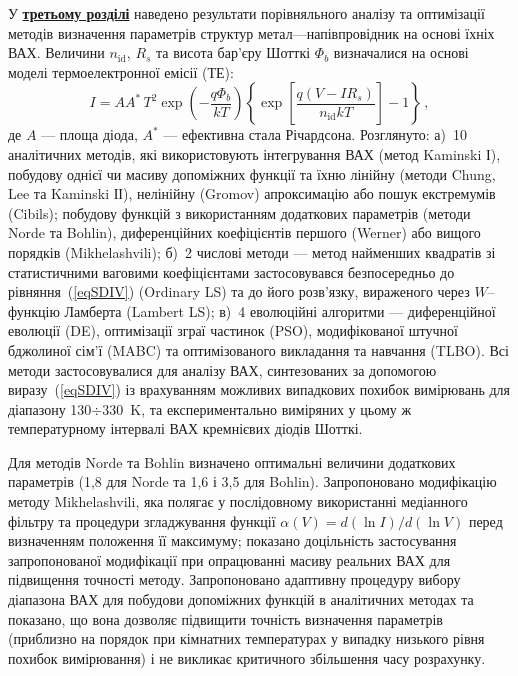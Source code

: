 У  \underline{\textbf{третьому розділі}} наведено результати порівняльного аналізу та оптимізації методів
визначення параметрів структур
метал---напівпровідник на основі їхніх ВАХ.
Величини $n_\mathrm{id}$, $R_s$ та висота бар'єру Шотткі $\Phi_b$ визначалися на основі
моделі термоелектронної емісії (ТЕ):
\begin{equation}\label{eqSDIV}
I=AA^*\,T^2\exp\left(-\frac{q\Phi_b}{kT}\right)\left\{\exp\left[\frac{q(V-IR_s)}{n_\mathrm{id}kT}\right]-1\right\}\,,
\end{equation}
де
$A$ --- площа діода,
$A^*$ --- ефективна стала Річардсона.
Розглянуто: 
а)~10 аналітичних методів, які використовують інтегрування ВАХ (метод Kaminski І),
побудову однієї чи масиву допоміжних функції та їхню лінійну (методи Chung, Lee та Kaminski ІІ),
нелінійну (Gromov) апроксимацію або пошук екстремумів (Cibils);
побудову функцій з використанням додаткових параметрів (методи Norde та Bohlin),
диференційних коефіцієнтів першого (Werner) або вищого порядків (Mikhelashvili);
б)~2 числові методи --- метод найменших квадратів зі статистичними ваговими коефіцієнтами
застосовувався безпосередньо до рівняння~(\ref{eqSDIV}) (Ordinary LS) та до
його розв'язку, вираженого через $W$--функцію Ламберта (Lambert LS);
в)~4 еволюційні алгоритми --- диференційної еволюції (DE),
оптимізації зграї частинок (PSO),
модифікованої штучної бджолиної сім'ї (MABC) та
оптимізованого викладання та навчання (TLBO).
Всі методи застосовувалися для аналізу
ВАХ,  синтезованих за допомогою виразу~(\ref{eqSDIV}) із врахуванням можливих випадкових похибок вимірювань
для діапазону 130$\div$330~K,
та експериментально виміряних у цьому ж температурному інтервалі ВАХ кремнієвих діодів Шотткі.

Для методів Norde та Bohlin визначено  оптимальні величини додаткових параметрів (1,8 для Norde та 1,6 і 3,5 для Bohlin).
Запропоновано модифікацію методу Mikhelashvili, яка
полягає у послідовному використанні медіанного фільтру та процедури згладжування функції $\alpha(V)=d(\ln I)/d(\ln V)$
перед визначенням положення її максимуму;
показано доцільність застосування запропонованої модифікації при опрацюванні масиву реальних ВАХ для
підвищення точності методу.
Запропоновано адаптивну процедуру вибору діапазона ВАХ для побудови допоміжних функцій в
аналітичних методах та показано, що вона дозволяє підвищити точність визначення параметрів
(приблизно на порядок при кімнатних температурах у випадку низького рівня похибок вимірювання)
і не викликає критичного збільшення часу розрахунку.



